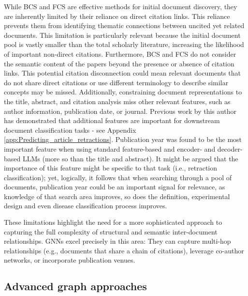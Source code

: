 \documentclass[10pt,oneside]{book}
\begin{document}
While BCS and FCS are effective methods for initial document discovery, they are inherently limited by their reliance on direct citation links. This reliance prevents them from identifying thematic connections between uncited yet related documents. This limitation is particularly relevant because the initial document pool is vastly smaller than the total scholarly literature, increasing the likelihood of important non-direct citations. Furthermore, BCS and FCS do not consider the semantic content of the papers beyond the presence or absence of citation links. This potential citation disconnection could mean relevant documents that do not share direct citations or use different terminology to describe similar concepts may be missed. Additionally, constraining document representations to the title, abstract, and citation analysis miss other relevant features, such as author information, publication date, or journal. Previous work by this author has demonstrated that additional features are important for downstream document classification tasks - see Appendix \ref{app:Predicting_article_retractions}. Publication year was found to be the most important feature when using standard feature-based and encoder- and decoder-based LLMs (more so than the title and abstract). It might be argued that the importance of this feature might be specific to that task (i.e., retraction classification); yet, logically, it follows that when searching through a pool of documents, publication year could be an important signal for relevance, as knowledge of that search area improves, so does the definition, experimental design and even disease classification process improves.

These limitations highlight the need for a more sophisticated approach to capturing the full complexity of structural and semantic inter-document relationships. GNNs excel precisely in this area: They can capture multi-hop relationships (e.g., documents that share a chain of citations), leverage co-author networks, or incorporate publication venues.

\subsection{Advanced graph approaches}
\end{document}
